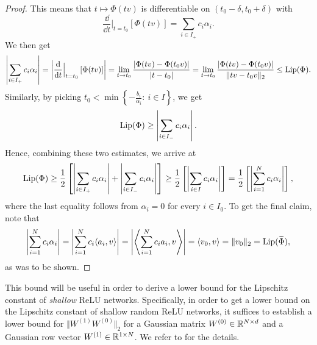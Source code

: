 \begin{proof}
This means that $t \mapsto \Phi(tv)$ is differentiable on $(t_0 - \delta, t_0 + \delta)$ with
\begin{equation*}
\frac{\dd}{\dd t}\Big|_{t= t_0}\left[\Phi(tv)\right] = \sum_{i \in I_+} c_i \alpha_i.
\end{equation*}
We then get
\begin{equation*}
\left\vert \sum_{i \in I_+} c_i \alpha_i \right\vert = \left\vert \frac{\mathrm{d}}{\mathrm{d} t}\Big|_{t=t_0}\left[\Phi(tv)\right]\right\vert = \lim_{t \to t_0} \frac{\vert \Phi(tv) - \Phi(t_0v)\vert}{\vert t - t_0 \vert} = \lim_{t \to t_0} \frac{\vert \Phi(tv) - \Phi(t_0v)\vert}{\Vert tv - t_0v \Vert_2} \leq \operatorname{Lip}(\Phi).
\end{equation*}
Similarly, by picking $t_0 < \min \left\{-\frac{b_i}{\alpha_i}: \ i \in I\right\}$, we get 
\begin{equation*}
\operatorname{Lip}(\Phi) \geq \left\vert \sum_{i \in I_-} c_i \alpha_i \right\vert.
\end{equation*}
Hence, combining these two estimates, we arrive at
\begin{equation*}
\operatorname{Lip}(\Phi) \geq \frac{1}{2} \left[ \left\vert \sum_{i \in I_+} c_i \alpha_i \right\vert + \left\vert \sum_{i \in I_-} c_i \alpha_i \right\vert\right] \geq \frac{1}{2} \left[\left\vert\sum_{i \in I} c_i \alpha_i  \right\vert\right] = \frac{1}{2} \left[\left\vert\sum_{i  = 1}^N c_i \alpha_i  \right\vert\right], 
\end{equation*}
where the last equality follows from $\alpha_i = 0$ for every $i \in I_0$. To get the final claim, note that
\begin{align*}
\left\vert\sum_{i  = 1}^N c_i \alpha_i  \right\vert = \left\vert\sum_{i  = 1}^N c_i \langle a_i, v \rangle  \right\vert =\left\vert \left\langle\sum_{i=1}^N c_i a_i, v \right\rangle \right\vert= \langle v_0, v \rangle = \Vert v_0 \Vert_2 = \operatorname{Lip}(\widetilde{\Phi}), 
\end{align*}
as was to be shown. 
\end{proof}
This bound will be useful in order to derive a lower bound for the Lipschitz constant of \emph{shallow} ReLU networks. 
Specifically, in order to get a lower bound on the Lipschitz constant of shallow random ReLU networks, 
it suffices to establish a lower bound for $\Vert W^{(1)} W^{(0)} \Vert_2$ for a Gaussian matrix $W^{(0)} \in \mathbb{R}^{N \times d}$ and a Gaussian row vector $W^{(1)} \in \mathbb{R}^{1 \times N}$. We refer to  for the details. 

